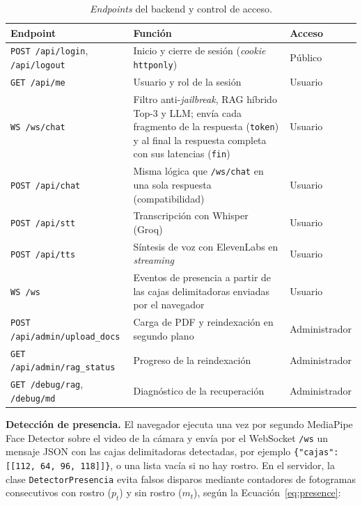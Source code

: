 \begin{table}[htbp]
  \caption{\textit{Endpoints} del backend y control de acceso.}
  \label{tab:endpoints}
  \centering
  \small
  \renewcommand{\arraystretch}{1.2}
  \begin{tabular}{|>{\raggedright\arraybackslash}p{4.3cm}|>{\raggedright\arraybackslash}p{5.6cm}|>{\raggedright\arraybackslash}p{2.7cm}|}
    \hline
    \rowcolor[HTML]{EFEFEF}
    \textbf{Endpoint} & \textbf{Función} & \textbf{Acceso} \\ \hline
    \texttt{POST /\allowbreak{}api/\allowbreak{}login}, \texttt{/api/logout} & Inicio y cierre de sesión (\textit{cookie} \texttt{httponly}) & Público \\ \hline
    \texttt{GET /api/me} & Usuario y rol de la sesión & Usuario \\ \hline
    \texttt{WS /\allowbreak{}ws/\allowbreak{}chat} & Filtro anti-\textit{jailbreak}, RAG híbrido Top-3 y LLM; envía cada fragmento de la respuesta (\texttt{token}) y al final la respuesta completa con sus latencias (\texttt{fin}) & Usuario \\ \hline
    \texttt{POST /\allowbreak{}api/\allowbreak{}chat} & Misma lógica que \texttt{/ws/chat} en una sola respuesta (compatibilidad) & Usuario \\ \hline
    \texttt{POST /api/stt} & Transcripción con Whisper (Groq) & Usuario \\ \hline
    \texttt{POST /api/tts} & Síntesis de voz con ElevenLabs en \textit{streaming} & Usuario \\ \hline
    \texttt{WS /ws} & Eventos de presencia a partir de las cajas delimitadoras enviadas por el navegador & Usuario \\ \hline
    \texttt{POST /\allowbreak{}api/\allowbreak{}admin/\allowbreak{}upload\_\allowbreak{}docs} & Carga de PDF y reindexación en segundo plano & Administrador \\ \hline
    \texttt{GET /\allowbreak{}api/\allowbreak{}admin/\allowbreak{}rag\_\allowbreak{}status} & Progreso de la reindexación & Administrador \\ \hline
    \texttt{GET /\allowbreak{}debug/\allowbreak{}rag}, \texttt{/debug/md} & Diagnóstico de la recuperación & Administrador \\ \hline
  \end{tabular}
  \elaboradopor{\autorTFG}
\end{table}

\textbf{Detección de presencia.} El navegador ejecuta una vez por segundo MediaPipe Face Detector sobre el video de la cámara y envía por el WebSocket \texttt{/ws} un mensaje JSON con las cajas delimitadoras detectadas, por ejemplo \texttt{\{"cajas": [[112, 64, 96, 118]]\}}, o una lista vacía si no hay rostro. En el servidor, la clase \texttt{DetectorPresencia} evita falsos disparos mediante contadores de fotogramas consecutivos con rostro ($p_t$) y sin rostro ($m_t$), según la Ecuación~\ref{eq:presence}:

